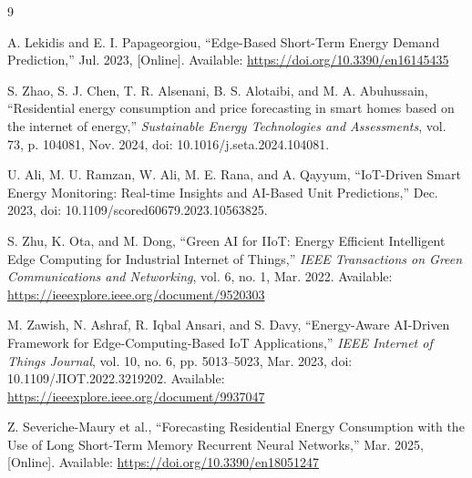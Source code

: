 \documentclass[12pt, a4paper]{article}
\begin{document}
\newpage
\begin{thebibliography}{9}

A. Lekidis and E. I. Papageorgiou, ``Edge-Based Short-Term Energy Demand Prediction,'' Jul. 2023, [Online]. Available: \url{https://doi.org/10.3390/en16145435}

S. Zhao, S. J. Chen, T. R. Alsenani, B. S. Alotaibi, and M. A. Abuhussain, ``Residential energy consumption and price forecasting in smart homes based on the internet of energy,'' \textit{Sustainable Energy Technologies and Assessments}, vol. 73, p. 104081, Nov. 2024, doi: 10.1016/j.seta.2024.104081.

U. Ali, M. U. Ramzan, W. Ali, M. E. Rana, and A. Qayyum, ``IoT-Driven Smart Energy Monitoring: Real-time Insights and AI-Based Unit Predictions,'' Dec. 2023, doi: 10.1109/scored60679.2023.10563825.

S. Zhu, K. Ota, and M. Dong, ``Green AI for IIoT: Energy Efficient Intelligent Edge Computing for Industrial Internet of Things,'' \textit{IEEE Transactions on Green Communications and Networking}, vol. 6, no. 1, Mar. 2022. Available: \url{https://ieeexplore.ieee.org/document/9520303}

M. Zawish, N. Ashraf, R. Iqbal Ansari, and S. Davy, ``Energy-Aware AI-Driven Framework for Edge-Computing-Based IoT Applications,'' \textit{IEEE Internet of Things Journal}, vol. 10, no. 6, pp. 5013–5023, Mar. 2023, doi: 10.1109/JIOT.2022.3219202. Available: \url{https://ieeexplore.ieee.org/document/9937047}

Z. Severiche-Maury et al., ``Forecasting Residential Energy Consumption with the Use of Long Short-Term Memory Recurrent Neural Networks,'' Mar. 2025, [Online]. Available: \url{https://doi.org/10.3390/en18051247}

\end{thebibliography}
\end{document}
